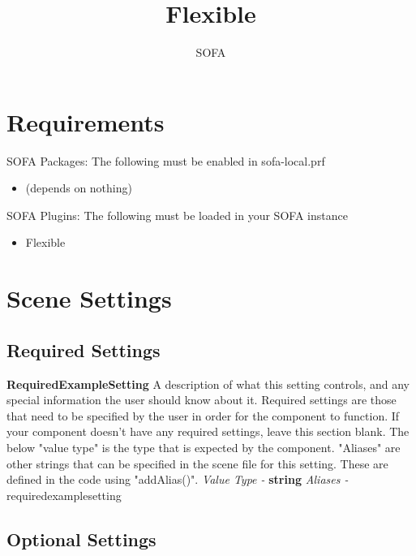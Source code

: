 \documentclass[a4paper,11pt]{article}
\newenvironment{componentoption}[1]%
{\textbf{#1}\newline}
{\newline}
\newcommand{\aliases}[1] {\newline \textit{Aliases - } #1}
\newcommand{\valuetype}[1] {\newline \textit{Value Type - } \textbf{#1}}
\begin{document}
\raggedright

\title{Flexible}
\author{SOFA}

\maketitle

\begin{abstract}

\end{abstract}




\section{Requirements}

SOFA Packages:
The following must be enabled in sofa-local.prf
\begin{itemize}
\item (depends on nothing)
\end{itemize}

SOFA Plugins:
The following must be loaded in your SOFA instance
\begin{itemize}
\item Flexible
\end{itemize}

\section{Scene Settings}

\subsection{Required Settings}

\begin{componentoption}{RequiredExampleSetting}
A description of what this setting controls, and any special information the user should know about it. Required settings are those that need to be specified by the user in order for the component to function. If your component doesn't have any required settings, leave this section blank. The below "value type" is the type that is expected by the component. "Aliases" are other strings that can be specified in the scene file for this setting. These are defined in the code using "addAlias()".
\valuetype{string}
\aliases{requiredexamplesetting}
\end{componentoption}


\subsection{Optional Settings}
\end{document}
